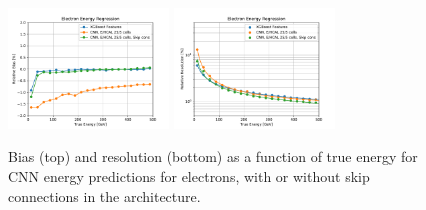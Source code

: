 \begin{figure}[htbp]
\centering
\includegraphics[width=0.38\textwidth]{Images/Calo/bias_vs_E_EleFixed_cnn_skip_zoom.pdf}
\includegraphics[width=0.38\textwidth]{Images/Calo/res_vs_E_EleFixed_cnn_skip_fits.pdf}
\caption{Bias (top) and resolution (bottom) as a function of true energy for CNN energy predictions for electrons, with or without skip connections in the architecture.
}
\label{fig:reg_cnn_skip}
\end{figure}